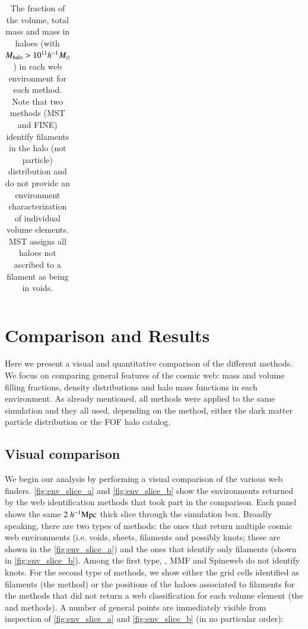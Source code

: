 \begin{center}
\begin{table}
\begin{flushright}
\begin{tabular}{|c|cccc|cccc|cccc|}
 & &&&&&&&&&&&\\
\hline
\end{tabular}
\vskip 0.5cm
\caption{The fraction of the volume, total mass and mass in haloes (with $M_{\rm halo} > 10^{11}h^{-1}M_{\odot}$) in each web environment for each method. Note that two methods (MST and FINE) identify filaments in the halo (not particle) distribution and do not provide an environment characterization of individual volume elements. MST assigns all haloes not ascribed to a filament as being in voids.}
  \label{tab:mff}
\end{flushright}
\end{table}
\end{center}


\section{Comparison and Results}
\label{sec:6results}

Here we present a visual and quantitative comparison of the different methods. We focus on comparing general features of the cosmic web: mass and volume filling fractions, density distributions and halo mass functions in each environment. As already mentioned, all methods were applied to the same simulation and they all used, depending on the method, either the dark matter particle distribution or the FOF halo catalog.

\subsection{Visual comparison}
\label{sec:cube}
We begin our analysis by performing a visual comparison of the various web finders. \autoref{fig:env_slice_a} and \autoref{fig:env_slice_b} show the environments returned by the web identification methods that took part in the comparison. Each panel shows the same $2~h^{-1}\rm Mpc$ thick slice through the simulation box. Broadly speaking, there are two types of methods: the ones that return multiple cosmic web environments (i.e. voids, sheets, filaments and possibly knots; these are shown in the \autoref{fig:env_slice_a}) and the ones that identify only filaments (shown in \autoref{fig:env_slice_b}). Among the first type, \disperse{}, MMF and Spineweb do not identify knots. For the second type of methods, we show either the grid cells identified as filaments (the \bisous{} method) or the positions of the haloes associated to filaments for the methods that did not return a web classification for each volume element (the \fine{} and \mst{} methods). A number of general points are immediately visible from inspection of \autoref{fig:env_slice_a} and \autoref{fig:env_slice_b} (in no particular order):

